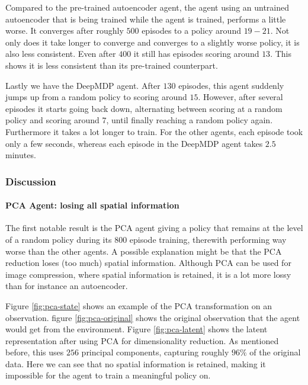Compared to the pre-trained autoencoder agent, the agent using an untrained autoencoder that is being trained while the agent is trained, performs a little worse. It converges after roughly $500$ episodes to a policy around $19-21$. Not only does it take longer to converge and converges to a slightly worse policy, it is also less consistent. Even after $400$ it still has episodes scoring around $13$. This shows it is less consistent than its pre-trained counterpart.

Lastly we have the DeepMDP agent. After $130$ episodes, this agent suddenly jumps up from a random policy to scoring around $15$. However, after several episodes it starts going back down, alternating between scoring at a random policy and scoring around $7$, until finally reaching a random policy again. Furthermore it takes a lot longer to train. For the other agents, each episode took only a few seconds, whereas each episode in the DeepMDP agent takes $2.5$ minutes.

\subsubsection{Discussion}\label{research-discussion-pysc2}
\paragraph{PCA Agent: losing all spatial information}
The first notable result is the PCA agent giving a policy that remains at the level of a random policy during its $800$ episode training, therewith performing way worse than the other agents. A possible explanation might be that the PCA reduction loses (too much) spatial information. Although PCA can be used for image compression, where spatial information is retained, it is a lot more lossy than for instance an autoencoder.

Figure \ref{fig:pca-state} shows an example of the PCA transformation on an observation. figure \ref{fig:pca-original} shows the original observation that the agent would get from the environment. Figure \ref{fig:pca-latent} shows the latent representation after using PCA for dimensionality reduction. As mentioned before, this uses $256$ principal components, capturing roughly $96\%$ of the original data. Here we can see that no spatial information is retained, making it impossible for the agent to train a meaningful policy on. 

